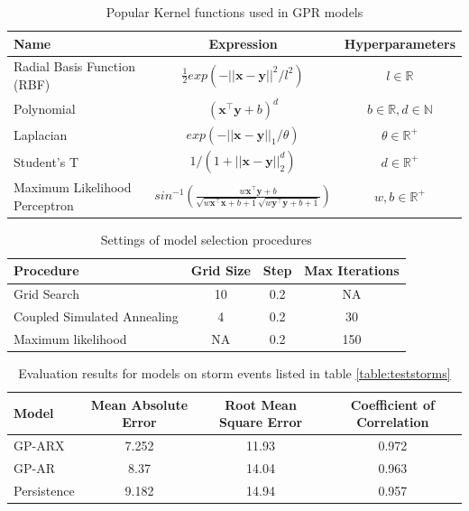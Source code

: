 \documentclass[sw, draft]{AGUTeX}
\begin{document}
\begin{table}
\caption{Popular Kernel functions used in GPR models}
\centering
\begin{tabular}{l c c}
\hline
 Name  & Expression & Hyperparameters  \\
\hline
  Radial Basis Function (RBF)  & $\frac{1}{2} exp(-||\mathbf{x} - \mathbf{y}||^2/l^2)$  & $l \in \mathbb{R}$   \\
  
  Polynomial  & $(\mathbf{x}^\intercal \mathbf{y} + b)^d$ & $b \in \mathbb{R}, d \in \mathbb{N}$   \\
  
  Laplacian  & $exp(-||\mathbf{x} - \mathbf{y}||_{1}/\theta)$  & $\theta \in \mathbb{R}^+$  \\
  
  Student's T  & $1/(1 + ||\mathbf{x} - \mathbf{y}||_{2}^d)$ & $d \in \mathbb{R}^{+}$\\
  
  Maximum Likelihood Perceptron  & $sin^{-1}(\frac{w\mathbf{x}^\intercal \mathbf{y} + b}{\sqrt{w\mathbf{x}^\intercal \mathbf{x} + b + 1} \sqrt{w\mathbf{y}^\intercal \mathbf{y} + b + 1}})$ & $w, b \in \mathbb{R}^{+}$\\
\hline
\end{tabular}
\label{table:kernel}
\end{table}

\begin{table}[]
\centering
\caption{Settings of model selection procedures}
\begin{tabular}{l c c c}
\hline
Procedure & Grid Size & Step & Max Iterations \\
\hline
Grid Search & 10 & 0.2 & NA \\
Coupled Simulated Annealing & 4 & 0.2 & 30 \\
Maximum likelihood & NA & 0.2 & 150\\
\end{tabular}
\label{table:modelselection}
\end{table}


\begin{table}[]
\centering
\caption{Evaluation results for models on storm events listed in table \ref{table:teststorms}}
\label{table:results}
\begin{tabular}{l c c c}
\hline
Model & Mean Absolute Error & Root Mean Square Error & Coefficient of Correlation\\ \hline
GP-ARX & 7.252 & 11.93 & 0.972\\
GP-AR & 8.37 & 14.04 & 0.963\\
Persistence & 9.182 & 14.94 & 0.957\\
\end{tabular}
\end{table}
\end{document}

